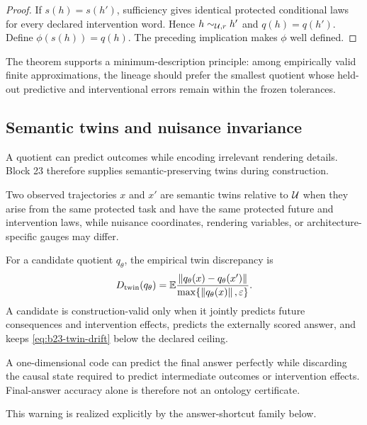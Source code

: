\begin{proof}
If $s(h)=s(h')$, sufficiency gives identical protected conditional laws for every declared intervention word.  Hence $h\sim_{\mathcal U,r}h'$ and $q(h)=q(h')$.  Define $\phi(s(h))=q(h)$.  The preceding implication makes $\phi$ well defined.
\end{proof}

The theorem supports a minimum-description principle: among empirically valid finite approximations, the lineage should prefer the smallest quotient whose held-out predictive and interventional errors remain within the frozen tolerances.

\subsection{Semantic twins and nuisance invariance}

A quotient can predict outcomes while encoding irrelevant rendering details.  Block 23 therefore supplies semantic-preserving twins during construction.

\begin{definition}
Two observed trajectories $x$ and $x'$ are semantic twins relative to $\mathcal U$ when they arise from the same protected task and have the same protected future and intervention laws, while nuisance coordinates, rendering variables, or architecture-specific gauges may differ.
\end{definition}

For a candidate quotient $q_\theta$, the empirical twin discrepancy is
\begin{equation}
D_{\mathrm{twin}}(q_\theta)
=
\mathbb E
\frac{\left\lVert q_\theta(x)-q_\theta(x')\right\rVert}
{\max\{\left\lVert q_\theta(x)\right\rVert,\varepsilon\}}.
\label{eq:b23-twin-drift}
\end{equation}
A candidate is construction-valid only when it jointly predicts future consequences and intervention effects, predicts the externally scored answer, and keeps \cref{eq:b23-twin-drift} below the declared ceiling.

\begin{warning}
A one-dimensional code can predict the final answer perfectly while discarding the causal state required to predict intermediate outcomes or intervention effects.  Final-answer accuracy alone is therefore not an ontology certificate.
\end{warning}

This warning is realized explicitly by the answer-shortcut family below.

